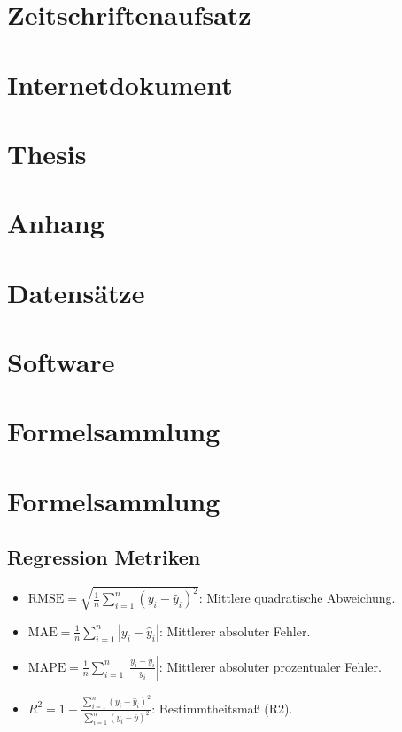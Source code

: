 \documentclass[headsepline,footsepline,footinclude=false,oneside,fontsize=11pt,paper=a4,listof=totoc,bibliography=totoc]{scrbook} %
\begin{document}
\section*{Zeitschriftenaufsatz}
\printbibliography[filter=zeitschriftenaufsatzfilter, heading=none]

\section*{Internetdokument}
\printbibliography[filter=internetdokumentfilter, heading=none]

\section*{Thesis}
\printbibliography[filter=thesisfilter, heading=none]

\printglossary[title=Glossar, toctitle=Glossar]

\newline

\section*{Anhang}

\section*{Datensätze}\label{datensaetze}
\printbibliography[filter=datensatzfilter, heading=none]

\section*{Software}
\printbibliography[filter=softwarefilter, heading=none]

\printbibliography[filter=repositoryfilter, heading=none]

\section*{Formelsammlung}

\section*{Formelsammlung}

\subsection*{Regression Metriken}
\begin{itemize}
  \item \( \text{RMSE} = \sqrt{\frac{1}{n} \sum_{i=1}^{n} (y_i - \hat{y}_i)^2} \): Mittlere quadratische Abweichung.
  \item \( \text{MAE} = \frac{1}{n} \sum_{i=1}^{n} |y_i - \hat{y}_i| \): Mittlerer absoluter Fehler.
  \item \( \text{MAPE} = \frac{1}{n} \sum_{i=1}^{n} \left| \frac{y_i - \hat{y}_i}{y_i} \right| \): Mittlerer absoluter prozentualer Fehler.
  \item \( R^2 = 1 - \frac{\sum_{i=1}^{n} (y_i - \hat{y}_i)^2}{\sum_{i=1}^{n} (y_i - \bar{y})^2} \): Bestimmtheitsmaß (R2).
\end{itemize}
\end{document}
